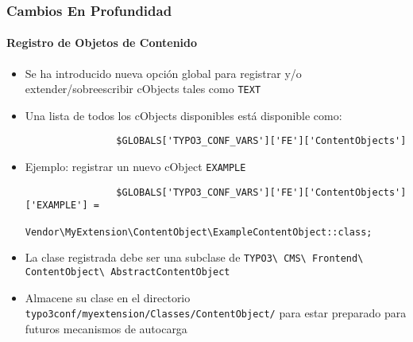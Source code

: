 
\begin{frame}[fragile]
	\frametitle{Cambios En Profundidad}
	\framesubtitle{Registro de Objetos de Contenido}

	\begin{itemize}

		\item Se ha introducido nueva opción global para registrar y/o extender/sobreescribir cObjects tales como
			\texttt{TEXT}

		\item Una lista de todos los cObjects disponibles está disponible como:

			\begin{lstlisting}
				$GLOBALS['TYPO3_CONF_VARS']['FE']['ContentObjects']
			\end{lstlisting}

		\item Ejemplo: registrar un nuevo cObject \texttt{EXAMPLE}

			\begin{lstlisting}
				$GLOBALS['TYPO3_CONF_VARS']['FE']['ContentObjects']['EXAMPLE'] =
				  Vendor\MyExtension\ContentObject\ExampleContentObject::class;
			\end{lstlisting}

		\item La clase registrada debe ser una subclase de
			\small
				\texttt{TYPO3\textbackslash
					CMS\textbackslash
					Frontend\textbackslash
					ContentObject\textbackslash
					AbstractContentObject}
			\normalsize

		\item Almacene su clase en el directorio\newline
			\small
				\texttt{typo3conf/myextension/Classes/ContentObject/}
			\normalsize\newline
			para estar preparado para futuros mecanismos de autocarga

	\end{itemize}

\end{frame}

